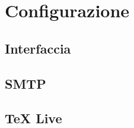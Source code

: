 \chapter{Configurazione}
\label{Configurazione}
\thispagestyle{empty}

\section{Interfaccia}


\section{SMTP}

\section{TeX Live}